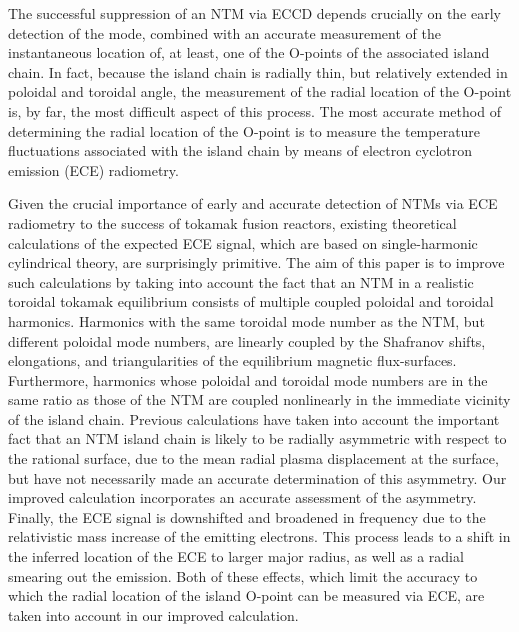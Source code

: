 \documentclass[12pt,prb,aps]{revtex4-1}
\begin{document}
The successful suppression of an NTM via ECCD depends crucially on the early detection of the mode, combined with an accurate measurement  of 
the instantaneous location of, at least, one of the O-points  of the associated island chain.\cite{eccd6} In fact, because the island chain is radially thin, 
but relatively extended in poloidal and toroidal angle, the measurement  of the radial location of the O-point is, by far,  the most difficult aspect of
this process. The most accurate method of determining the radial location of the O-point is to measure the temperature fluctuations associated with the island
chain by means of electron cyclotron emission (ECE) radiometry.\cite{ece1,ece2,ntm2,ece4}

Given the crucial importance of early and accurate detection of NTMs via ECE radiometry to the success of tokamak fusion reactors, existing theoretical calculations of
the expected ECE signal, which are based on single-harmonic cylindrical theory, are surprisingly primitive.\cite{eccd6,ece4,ece4a} The aim of this paper is to
improve such calculations by taking into account the fact that an NTM  in a realistic toroidal tokamak equilibrium consists of multiple coupled poloidal and toroidal harmonics. Harmonics with the same toroidal mode number as the NTM, but different poloidal mode numbers, are linearly coupled by the
Shafranov shifts, elongations, and triangularities of the equilibrium magnetic flux-surfaces.\cite{tear2,tear3,tear5} Furthermore, harmonics whose poloidal and
toroidal mode numbers are in the same ratio as those of the NTM are coupled nonlinearly in the immediate vicinity of the island chain.\cite{ntm1,ntm2}
Previous calculations have taken into account the important fact that an NTM island chain is likely to be radially asymmetric with respect to the rational surface,\cite{ece6a,ece6} 
due to the mean radial plasma displacement at the  surface, but have not necessarily made an accurate
determination of this asymmetry.\cite{eccd6} Our improved calculation incorporates an accurate assessment of the asymmetry. Finally, the ECE signal 
is downshifted and broadened in frequency due to the relativistic mass increase of the emitting electrons.\cite{ece1,ece2,ece5}  This process leads to a shift in the inferred location
of the ECE  to larger major radius, as well as a radial smearing out the emission. Both of these effects, which limit the accuracy to which the
radial location of the island O-point can be measured via ECE,  are taken into account in our improved calculation.
\end{document}
